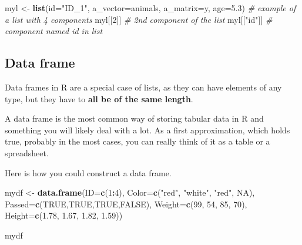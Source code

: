 \documentclass[
]{book}
\newenvironment{Shaded}{\begin{snugshade}}{\end{snugshade}}
\newcommand{\AttributeTok}[1]{\textcolor[rgb]{0.13,0.29,0.53}{#1}}
\newcommand{\CommentTok}[1]{\textcolor[rgb]{0.56,0.35,0.01}{\textit{#1}}}
\newcommand{\ConstantTok}[1]{\textcolor[rgb]{0.56,0.35,0.01}{#1}}
\newcommand{\DecValTok}[1]{\textcolor[rgb]{0.00,0.00,0.81}{#1}}
\newcommand{\FloatTok}[1]{\textcolor[rgb]{0.00,0.00,0.81}{#1}}
\newcommand{\FunctionTok}[1]{\textcolor[rgb]{0.13,0.29,0.53}{\textbf{#1}}}
\newcommand{\NormalTok}[1]{#1}
\newcommand{\OtherTok}[1]{\textcolor[rgb]{0.56,0.35,0.01}{#1}}
\newcommand{\SpecialCharTok}[1]{\textcolor[rgb]{0.81,0.36,0.00}{\textbf{#1}}}
\newcommand{\StringTok}[1]{\textcolor[rgb]{0.31,0.60,0.02}{#1}}
\begin{document}
\begin{Shaded}
\begin{Highlighting}[]
\NormalTok{myl }\OtherTok{\textless{}{-}} \FunctionTok{list}\NormalTok{(}\AttributeTok{id=}\StringTok{"ID\_1"}\NormalTok{, }\AttributeTok{a\_vector=}\NormalTok{animals, }\AttributeTok{a\_matrix=}\NormalTok{y, }\AttributeTok{age=}\FloatTok{5.3}\NormalTok{) }\CommentTok{\# example of a list with 4 components}
\NormalTok{myl[[}\DecValTok{2}\NormalTok{]] }\CommentTok{\# 2nd component of the list}
\NormalTok{myl[[}\StringTok{"id"}\NormalTok{]] }\CommentTok{\# component named id in list}
\end{Highlighting}
\end{Shaded}

\hypertarget{data-frame}{%
\subsection{Data frame}\label{data-frame}}

Data frames in R are a special case of lists, as they can have elements of any type, but they have to \textbf{all be of the same length}.

A data frame is the most common way of storing tabular data in R and something you will likely deal with a lot. As a first approximation, which holds true, probably in the most cases, you can really think of it as a table or a spreadsheet.

Here is how you could construct a data frame.

\begin{Shaded}
\begin{Highlighting}[]
\NormalTok{mydf }\OtherTok{\textless{}{-}} \FunctionTok{data.frame}\NormalTok{(}\AttributeTok{ID=}\FunctionTok{c}\NormalTok{(}\DecValTok{1}\SpecialCharTok{:}\DecValTok{4}\NormalTok{),}
                   \AttributeTok{Color=}\FunctionTok{c}\NormalTok{(}\StringTok{"red"}\NormalTok{, }\StringTok{"white"}\NormalTok{, }\StringTok{"red"}\NormalTok{, }\ConstantTok{NA}\NormalTok{),}
                   \AttributeTok{Passed=}\FunctionTok{c}\NormalTok{(}\ConstantTok{TRUE}\NormalTok{,}\ConstantTok{TRUE}\NormalTok{,}\ConstantTok{TRUE}\NormalTok{,}\ConstantTok{FALSE}\NormalTok{),}
                   \AttributeTok{Weight=}\FunctionTok{c}\NormalTok{(}\DecValTok{99}\NormalTok{, }\DecValTok{54}\NormalTok{, }\DecValTok{85}\NormalTok{, }\DecValTok{70}\NormalTok{),}
                   \AttributeTok{Height=}\FunctionTok{c}\NormalTok{(}\FloatTok{1.78}\NormalTok{, }\FloatTok{1.67}\NormalTok{, }\FloatTok{1.82}\NormalTok{, }\FloatTok{1.59}\NormalTok{))}

\NormalTok{mydf}
\end{Highlighting}
\end{Shaded}
\end{document}
